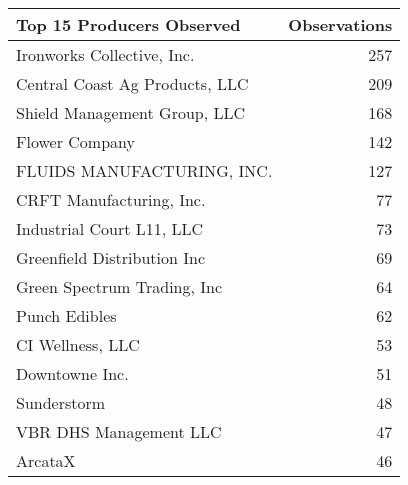 \begin{tabular}{lr}
\toprule
Top 15 Producers Observed & Observations \\
\midrule
Ironworks Collective, Inc. & 257 \\
Central Coast Ag Products, LLC & 209 \\
Shield Management Group, LLC & 168 \\
Flower Company & 142 \\
FLUIDS MANUFACTURING, INC. & 127 \\
CRFT Manufacturing, Inc. & 77 \\
Industrial Court L11, LLC & 73 \\
Greenfield Distribution Inc & 69 \\
Green Spectrum Trading, Inc & 64 \\
Punch Edibles & 62 \\
CI Wellness, LLC & 53 \\
Downtowne Inc. & 51 \\
Sunderstorm & 48 \\
VBR DHS Management LLC & 47 \\
ArcataX & 46 \\
\bottomrule
\end{tabular}
